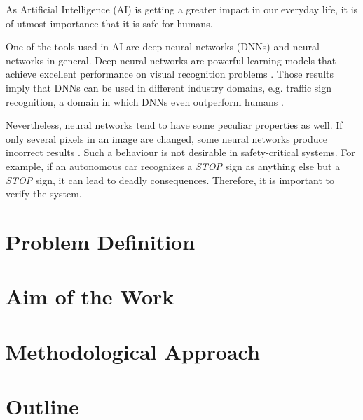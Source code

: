 As Artificial Intelligence (AI) is getting a greater impact in our everyday life, it is of utmost importance that it is safe for humans.  

One of the tools used in AI are deep neural networks (DNNs) and neural networks in general. Deep neural networks are powerful learning models that achieve excellent performance on visual recognition problems \cite{krizhevsky2012imagenet}. Those results imply that DNNs can be used in different industry domains, e.g. traffic sign recognition, a domain in which DNNs even outperform humans \cite{outperformhumans}. 

Nevertheless, neural networks tend to have some peculiar properties as well. If only several pixels in an image are changed, some neural networks produce incorrect results \cite{szegedy2013intriguing}. Such a behaviour is not desirable in safety-critical systems. For example, if an autonomous car recognizes a  \textit{STOP} sign as anything else but a \textit{STOP} sign, it can lead to deadly consequences. Therefore, it is important to verify the system. 

\section{Problem Definition} 
\label{motivation}


\section{Aim of the Work}


\section{Methodological Approach} \label{approach}


\section{Outline} 



